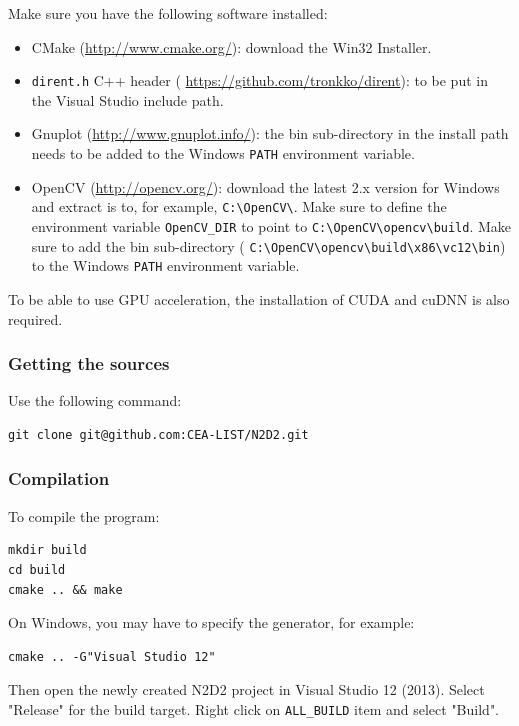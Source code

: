 \documentclass[a4paper,11pt,oneside]{article}
\newenvironment{myitemize}
{ \begin{itemize}
    \setlength{\itemsep}{0pt}
    \setlength{\parskip}{0pt}
    \setlength{\parsep}{0pt}     }
{ \end{itemize}                  }
\begin{document}
Make sure you have the following software installed:
\begin{myitemize}
    \item CMake (\url{http://www.cmake.org/}): download the Win32 Installer.
    \item \lstinline!dirent.h! C++ header (
    \url{https://github.com/tronkko/dirent}): to be put in the Visual Studio
    include path.
    \item Gnuplot (\url{http://www.gnuplot.info/}): the bin sub-directory in
    the install path needs to be added to the Windows \lstinline!PATH!
     environment variable.
    \item OpenCV (\url{http://opencv.org/}): download the latest 2.x version
    for Windows and extract is to, for example,
    \lstinline!C:\OpenCV\!.
  Make sure to define the environment variable \lstinline!OpenCV_DIR! to point
  to \lstinline!C:\OpenCV\opencv\build!.
  Make sure to add the bin sub-directory (%
\lstinline!C:\OpenCV\opencv\build\x86\vc12\bin!) to the Windows
  \lstinline!PATH! environment variable.
\end{myitemize}

To be able to use GPU acceleration, the installation of CUDA and cuDNN is also
required.

\subsubsection{Getting the sources}

\noindent Use the following command:
\begin{lstlisting}
git clone git@github.com:CEA-LIST/N2D2.git
\end{lstlisting}

\subsubsection{Compilation}

\noindent To compile the program:
\begin{lstlisting}
mkdir build
cd build
cmake .. && make
\end{lstlisting}

On Windows, you may have to specify the generator, for example:
\begin{lstlisting}
cmake .. -G"Visual Studio 12"
\end{lstlisting}

Then open the newly created N2D2 project in Visual Studio 12 (2013). Select
"Release" for the build target. Right click on \lstinline!ALL_BUILD! item and
select "Build".
\end{document}
